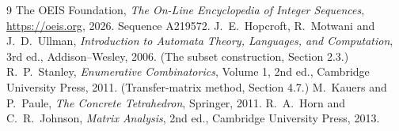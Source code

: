 \documentclass[11pt,a4paper]{article}
\theoremstyle{plain}
\theoremstyle{definition}
\begin{document}
\begin{thebibliography}{9}
 The OEIS Foundation, \emph{The On-Line Encyclopedia of Integer
Sequences}, \url{https://oeis.org}, 2026. Sequence A219572.
 J.~E.~Hopcroft, R.~Motwani and J.~D.~Ullman, \emph{Introduction to Automata
Theory, Languages, and Computation}, 3rd ed., Addison--Wesley, 2006. (The subset
construction, Section 2.3.)
 R.~P.~Stanley, \emph{Enumerative Combinatorics}, Volume 1, 2nd ed.,
Cambridge University Press, 2011. (Transfer-matrix method, Section 4.7.)
 M.~Kauers and P.~Paule, \emph{The Concrete Tetrahedron}, Springer, 2011.
 R.~A.~Horn and C.~R.~Johnson, \emph{Matrix Analysis}, 2nd ed., Cambridge
University Press, 2013.
\end{thebibliography}
\end{document}
